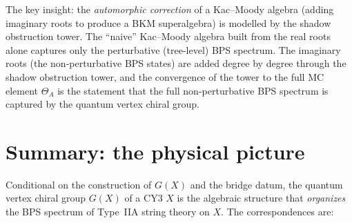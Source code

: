 \documentclass[11pt]{article}
\theoremstyle{definition}
\begin{document}
The key insight: the \emph{automorphic correction} of a Kac--Moody
algebra (adding imaginary roots to produce a BKM superalgebra) is
modelled by the shadow obstruction tower. The ``naive'' Kac--Moody algebra built from the real
roots alone captures only the perturbative (tree-level) BPS spectrum.
The imaginary roots (the non-perturbative BPS states) are added
degree by degree through the shadow obstruction tower, and the convergence of the
tower to the full MC element $\Theta_A$ is the statement that the
full non-perturbative BPS spectrum is captured by the quantum vertex
chiral group.

\section{Summary: the physical picture}
\label{sec:summary}

Conditional on the construction of $G(X)$ and the bridge datum, the
quantum vertex chiral group $G(X)$ of a CY3 $X$ is the algebraic
structure that \emph{organizes} the BPS spectrum of Type~IIA string
theory on $X$. The correspondences are:
\end{document}
